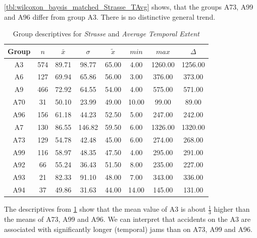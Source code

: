 \cref{tbl:wilcoxon_baysis_matched_Strasse_TAvg} shows, that the groups A73, A99 and A96 differ from group A3. There is no distinctive general trend.
\begin{table}[ht]
	\tiny
	\centering
	\begin{tabular}{c|c|c|c|c|c|c|c}
		\toprule
		Group & $n$ & $\bar{x}$ & $\sigma$ & $\tilde{x}$ & $min$ & $max$ & $\Delta$ \\  
		\midrule
		A3 & 574 & 89.71 & 98.77 & 65.00 & 4.00 & 1260.00 & 1256.00 \\ 
		A6 & 127 & 69.94 & 65.86 & 56.00 & 3.00 & 376.00 & 373.00 \\ 
		A9 & 466 & 72.92 & 64.55 & 54.00 & 4.00 & 575.00 & 571.00 \\ 
		A70 & 31 & 50.10 & 23.99 & 49.00 & 10.00 & 99.00 & 89.00 \\ 
		A96 & 156 & 61.18 & 44.23 & 52.50 & 5.00 & 247.00 & 242.00 \\ 
		A7 & 130 & 86.55 & 146.82 & 59.50 & 6.00 & 1326.00 & 1320.00 \\ 
		A73 & 129 & 54.78 & 42.48 & 45.00 & 6.00 & 274.00 & 268.00 \\ 
		A99 & 116 & 58.97 & 48.35 & 47.50 & 4.00 & 295.00 & 291.00 \\ 
		A92 & 66 & 55.24 & 36.43 & 51.50 & 8.00 & 235.00 & 227.00 \\ 
		A93 & 21 & 82.33 & 91.10 & 48.00 & 7.00 & 343.00 & 336.00 \\ 
		A94 & 37 & 49.86 & 31.63 & 44.00 & 14.00 & 145.00 & 131.00 \\ 
		\bottomrule
	\end{tabular}
	\caption{Group descriptives for \textit{Strasse} and \textit{Average Temporal Extent}}
	\label{tbl:descriptives_baysis_matched_Strasse_TAvg}
\end{table}
The descriptives from \cref{tbl:descriptives_baysis_matched_Strasse_TAvg} show that the mean value of A3 is about $\frac{1}{3}$ higher than the means of A73, A99 and A96. We can interpret that accidents on the A3 are associated with significantly longer (temporal) jams than on A73, A99 and A96.

